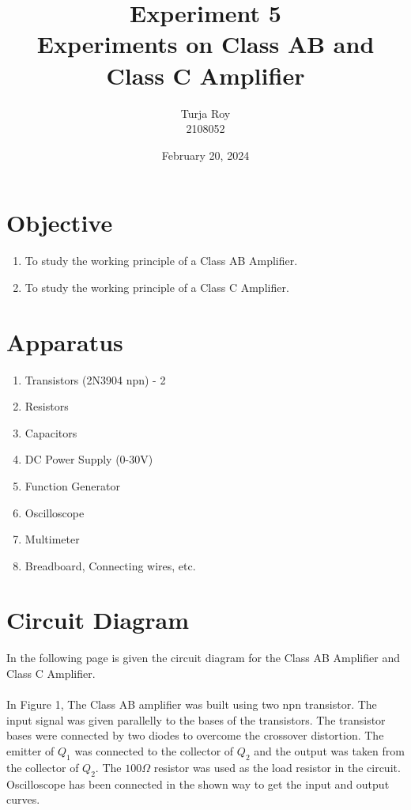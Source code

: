 \documentclass[12pt]{article}
\title{
    \textbf{\Large Experiment 5}\\
    \textbf{\Large Experiments on Class AB and Class C Amplifier}
}
\author{
    Turja Roy\\
    2108052
}
\date{February 20, 2024}
\begin{document}
\maketitle

\section{Objective}
\begin{enumerate}
    \item To study the working principle of a Class AB Amplifier.
    \item To study the working principle of a Class C Amplifier.
\end{enumerate}

\section{Apparatus}
\begin{enumerate}
    \item Transistors (2N3904 npn) - 2
    \item Resistors
    \item Capacitors
    \item DC Power Supply (0-30V)
    \item Function Generator
    \item Oscilloscope
    \item Multimeter
    \item Breadboard, Connecting wires, etc.
\end{enumerate}

\section{Circuit Diagram}
In the following page is given the circuit diagram for the Class AB Amplifier and Class C Amplifier. \\~\\

In Figure 1, The Class AB amplifier was built using two npn transistor. The input signal was given parallelly to the bases of the transistors. The transistor bases were connected by two diodes to overcome the crossover distortion. The emitter of $Q_1$ was connected to the collector of $Q_2$ and the output was taken from the collector of $Q_2$. The $100 \Omega$ resistor was used as the load resistor in the circuit. Oscilloscope has been connected in the shown way to get the input and output curves. \\~\\
\end{document}
